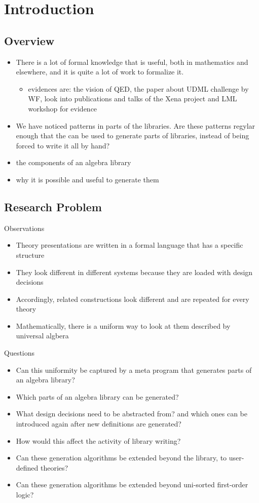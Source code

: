 \documentclass[]{article}
\begin{document}
    
\section{Introduction}
\subsection{Overview}
\begin{itemize}
    \item There is a lot of formal knowledge that
    is useful, both in mathematics and elsewhere, and it is quite a lot of
    work to formalize it. 
    \begin{itemize}
        \item evidences are: the vision of QED, the paper about UDML challenge by WF, look into publications and talks of the Xena project and LML workshop for evidence 
    \end{itemize}
        \item We have noticed patterns in parts of the libraries. Are these patterns regylar enough that the can be used to generate parts of libraries, instead of being forced to write it all by hand? 
        \item the components of an algebra library 
        \item why it is possible and useful to generate them 
\end{itemize}

\subsection{Research Problem}
Observations
\begin{itemize}
    \item Theory presentations are written in a formal language that has a specific structure 
    \item They look different in different systems because they are loaded with design decisions 
    \item Accordingly, related constructions look different and are repeated for every theory 
    \item Mathematically, there is a uniform way to look at them described by universal algbera 
\end{itemize}    
Questions 
\begin{itemize}
    \item Can this uniformity be captured by a meta program that generates parts of an algebra library? 
    \item Which parts of an algebra library can be generated? 
    \item What design decisions need to be abstracted from? and which ones can be introduced again after new definitions are generated?
    \item How would this affect the activity of library writing?
    \item Can these generation algorithms be extended beyond the library, to user-defined theories? 
    \item Can these generation algorithms be extended beyond uni-sorted first-order logic?  
\end{itemize}
    
\end{document}
